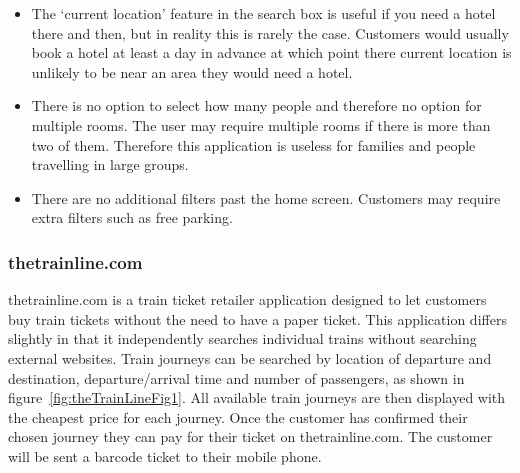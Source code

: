 \begin{itemize}
	\item The `current location' feature in the search box is useful if you
		need a hotel there and then, but in reality this is rarely the case.
		Customers would usually book a hotel at least a day in advance at which
		point there current location is unlikely to be near an area they would
		need a hotel.
	\item There is no option to select how many people and therefore no option
		for multiple rooms. The user may require multiple rooms if there is
		more than two of them. Therefore this application is useless for
		families and people travelling in large groups.
	\item There are no additional filters past the home screen. Customers may
		require extra filters such as free parking.
\end{itemize}

\subsubsection{thetrainline.com}
\label{ssub:thetrainline}

thetrainline.com is a train ticket retailer application designed to let
customers buy train tickets without the need to have a paper ticket. This
application differs slightly in that it independently searches individual
trains without searching external websites. Train journeys can be searched by
location of departure and destination, departure/arrival  time and number of
passengers, as shown in figure~\ref{fig:theTrainLineFig1}. All available train
journeys are then displayed with the cheapest price for each journey.  Once the
customer has confirmed their chosen journey they can pay for their ticket on
thetrainline.com. The customer will be sent a barcode ticket to their mobile
phone.

